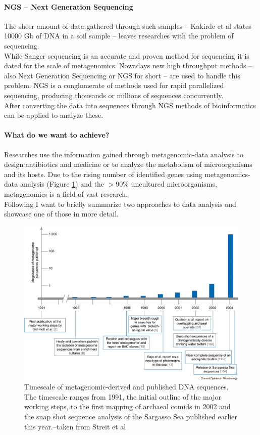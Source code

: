 \documentclass[twocolumn]{bmcart}%
\begin{document}
\paragraph*{NGS -- Next Generation Sequencing}
The sheer amount of data gathered through such samples -- Kakirde et al\cite{KAKIRDE20101911} states 10000 Gb of DNA in a soil sample -- leaves researches with the problem of sequencing.\\
While Sanger sequencing is an accurate and proven method for sequencing it is dated for the scale of metagenomics. Nowadays new high throughput methods -- also Next Generation Sequencing or NGS for short -- are used to handle this problem. NGS is a conglomerate of methods used  for rapid parallelized sequencing, producing thousands or millions of sequences concurrently.\\
 After converting the data into sequences through NGS methods of bioinformatics can be applied to analyze these.
\paragraph*{What do we want to achieve?}
Researches use the information gained through metagenomic-data analysis to design antibiotics and medicine or to analyze the metabolism of microorganisms and its hosts. Due to the rising number of identified genes using metagenomics-data analysis (Figure \ref{img:nov_gene_discov}) and the  $>$90\% uncultured microorganisms, metagenomics is a field of vast research.\\
Following I want to briefly summarize two approaches to data analysis and showcase one of those in more detail.
\begin{figure}
	\centering
\includegraphics[width=.9\linewidth]{bilder/growth_of_novel_gene_discovery.jpg}	
\caption{Timescale of metagenomic-derived and published DNA sequences. The timescale ranges from 1991, the initial outline of the major working steps, to the first mapping of archaeal comids in 2002 and the snap shot sequence analysis of the Sargasso Sea published earlier this year.--taken from Streit et al \cite{STREIT2004492}}
\label{img:nov_gene_discov}
\end{figure}
\end{document}
